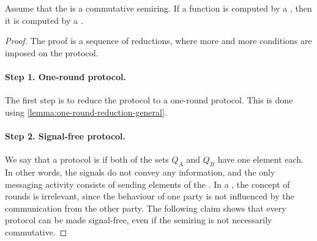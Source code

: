 \begin{lemma}\label{lem:scalar-product-reduction}
  Assume that the  is a commutative semiring. 
  If a function is computed by a , 
  then it is computed by a .
\end{lemma}
\begin{proof}
    The proof is a sequence of reductions, 
    where more and more conditions are imposed on the protocol.  
    
    \paragraph*{Step 1. One-round protocol.} 
    The first step is to reduce the protocol to a one-round protocol. 
    This is done using \cref{lemma:one-round-reduction-general}.



 \paragraph*{Step 2. Signal-free protocol.}  \AP 
 We say that a protocol is
  if both of the sets $Q_A$ and $Q_B$ have one element each.
 In other words, the signals do not convey any information, and the only
 messaging activity consists of sending elements of the . In a
 , the concept of rounds is irrelevant, since the behaviour
 of one party is not influenced by the communication from the other party. The following claim shows that every protocol can be made signal-free, even if the semiring is not necessarily commutative. 




\end{proof}
